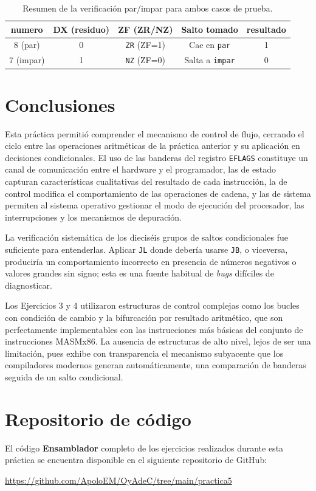 \documentclass[a4paper,12pt]{article}
\begin{document}
\begin{table}[H]
\centering
\caption{Resumen de la verificación par/impar para ambos casos de prueba.}
\begin{tabular}{ccccc}
\toprule
\textbf{numero} & \textbf{DX (residuo)} & \textbf{ZF (ZR/NZ)} & \textbf{Salto tomado} & \textbf{resultado} \\
\midrule
8 (par)   & 0 & \texttt{ZR} (ZF=1) & Cae en \texttt{par}    & 1 \\
7 (impar) & 1 & \texttt{NZ} (ZF=0) & Salta a \texttt{impar} & 0 \\
\bottomrule
\end{tabular}
\end{table}

\newpage
\section{Conclusiones}
Esta práctica permitió comprender el mecanismo de control de flujo, cerrando el ciclo entre las operaciones aritméticas de la práctica anterior y su aplicación en decisiones condicionales. El uso de las banderas del registro \texttt{EFLAGS} constituye un canal de comunicación entre el hardware y el programador, las de estado capturan características cualitativas del resultado de cada instrucción, la de control modifica el comportamiento de las operaciones de cadena, y las de sistema permiten al sistema operativo gestionar el modo de ejecución del procesador, las interrupciones y los mecanismos de depuración.

La verificación sistemática de los dieciséis grupos de saltos condicionales fue suficiente para entenderlas. Aplicar \texttt{JL} donde debería usarse \texttt{JB}, o viceversa, produciría un comportamiento incorrecto en presencia de números negativos o valores grandes sin signo; esta es una fuente habitual de \textit{bugs} difíciles de diagnosticar.

Los Ejercicios 3 y 4 utilizaron estructuras de control complejas como los bucles con condición de cambio y la bifurcación por resultado aritmético, que son perfectamente implementables con las instrucciones más básicas del conjunto de instrucciones MASMx86. La ausencia de estructuras de alto nivel, lejos de ser una limitación, pues exhibe con transparencia el mecanismo subyacente que los compiladores modernos generan automáticamente, una comparación de banderas seguida de un salto condicional.

\nocite{*}
\printbibliography[title={Referencias}]

\appendix
\section{Repositorio de código}
El código \textbf{Ensamblador} completo de los ejercicios realizados durante esta práctica se encuentra disponible en el siguiente repositorio de GitHub:

\begin{center}
\url{https://github.com/ApoloEM/OyAdeC/tree/main/practica5}
\end{center}
\end{document}
